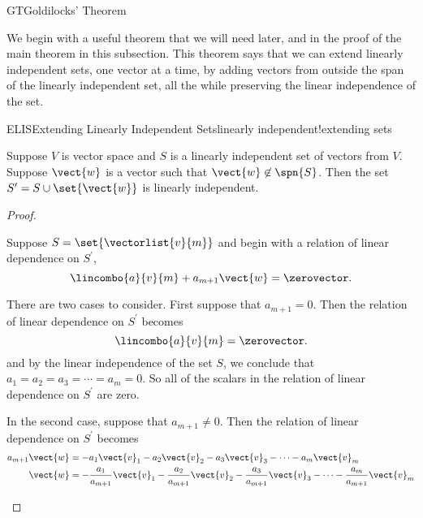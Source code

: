 \begin{subsect}{GT}{Goldilocks' Theorem}
%
\begin{para}We begin with a useful theorem that we will need later, and in the proof of the main theorem in this subsection.  This theorem says that we can extend linearly independent sets, one vector at a time, by adding vectors from outside the span of the linearly independent set, all the while preserving the  linear independence of the set.\end{para}
%
\begin{theorem}{ELIS}{Extending Linearly Independent Sets}{linearly independent!extending sets}
\begin{para}Suppose $V$ is vector space and $S$ is a linearly independent set of vectors from $V$.  Suppose $\vect{w}$ is a vector such that $\vect{w}\not\in\spn{S}$.  Then the set $S^\prime=S\cup\set{\vect{w}}$ is linearly independent.\end{para}
\end{theorem}
%
\begin{proof}
\begin{para}Suppose $S=\set{\vectorlist{v}{m}}$ and begin with a relation of linear dependence on $S^\prime$,
%
\begin{equation*}
\lincombo{a}{v}{m}+a_{m+1}\vect{w}=\zerovector.
\end{equation*}
\end{para}
%
\begin{para}There are two cases to consider.  First suppose that $a_{m+1}=0$.  Then the relation of linear dependence on $S^\prime$ becomes
%
\begin{equation*}
\lincombo{a}{v}{m}=\zerovector.
\end{equation*}
%
and by the linear independence of the set $S$, we conclude that $a_1=a_2=a_3=\cdots=a_m=0$.  So all of the scalars in the relation of linear dependence on $S^\prime$ are zero.\end{para}
%
\begin{para}In the second case, suppose that $a_{m+1}\neq 0$.    Then the relation of linear dependence on $S^\prime$ becomes
%
\begin{align*}
a_{m+1}\vect{w}&=-a_1\vect{v}_1-a_2\vect{v}_2-a_3\vect{v}_3-\cdots-a_m\vect{v}_m\\
\vect{w}&=-\frac{a_1}{a_{m+1}}\vect{v}_1-\frac{a_2}{a_{m+1}}\vect{v}_2-\frac{a_3}{a_{m+1}}\vect{v}_3-\cdots-\frac{a_m}{a_{m+1}}\vect{v}_m
\end{align*}
\end{para}

\end{proof}
\end{subsect}
